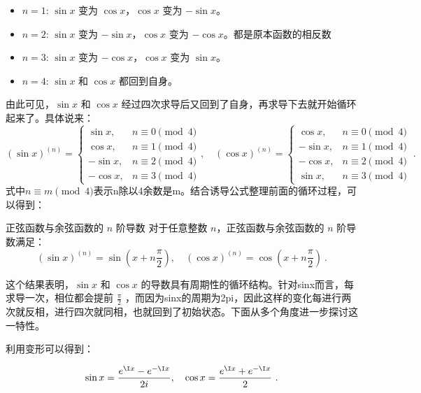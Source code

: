 \begin{itemize}
\item $n = 1$: $\sin x$ 变为 $\cos x$，$\cos x$ 变为 $-\sin x$。
\item $n = 2$: $\sin x$ 变为 $-\sin x$，$\cos x$ 变为 $-\cos x$。都是原本函数的相反数
\item $n = 3$: $\sin x$ 变为 $-\cos x$，$\cos x$ 变为 $\sin x$。
\item $n = 4$: $\sin x$ 和 $\cos x$ 都回到自身。
\end{itemize}
由此可见，$\sin x$ 和 $\cos x$ 经过四次求导后又回到了自身，再求导下去就开始循环起来了。具体说来：
\begin{equation}
(\sin x)^{(n)}  =
\begin{cases}
\sin x, & n \equiv 0 \pmod{4} \\
\cos x, & n \equiv 1 \pmod{4} \\
-\sin x, & n \equiv 2 \pmod{4} \\
-\cos x, & n \equiv 3 \pmod{4}
\end{cases},\quad(\cos x)^{(n)} =
\begin{cases}
\cos x, & n \equiv 0 \pmod{4} \\
-\sin x, & n \equiv 1 \pmod{4} \\
-\cos x, & n \equiv 2 \pmod{4} \\
\sin x, & n \equiv 3 \pmod{4}
\end{cases}~.
\end{equation}
式中$n \equiv m \pmod{4}$表示n除以4余数是m。结合诱导公式整理前面的循环过程，可以得到：

\begin{corollary}{正弦函数与余弦函数的 $n$ 阶导数}
对于任意整数 $n$，正弦函数与余弦函数的 $n$ 阶导数满足：
\begin{equation}
(\sin x)^{(n)} = \sin\left(x + n\frac{\pi}{2}\right), \quad
(\cos x)^{(n)} = \cos\left(x + n\frac{\pi}{2}\right)~.
\end{equation}
\end{corollary}

这个结果表明，$\sin x$ 和 $\cos x$ 的导数具有周期性的循环结构。针对sinx而言，每求导一次，相位都会提前 $\frac{\pi}{2}$ ，而因为sinx的周期为2pi，因此这样的变化每进行两次就反相，进行四次就同相，也就回到了初始状态。下面从多个角度进一步探讨这一特性。




利用变形可以得到：

\begin{equation}
\sin x = \frac{e^{\I x} - e^{-\I x}}{2i}, \quad \cos x = \frac{e^{\I x} + e^{-\I x}}{2}~.
\end{equation}

